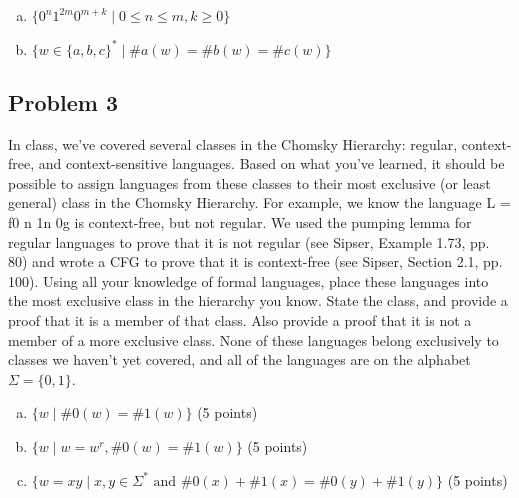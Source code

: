 \documentclass{article}
\begin{document}
\begin{enumerate}[(a)]
    \item $\{ 0^n 1^{2m} 0^{m+k} \;|\; 0 \le n \le m, k \ge 0 \}$
    \item $\{w\in \{a,b,c\}^* \;|\; \#a(w)=\#b(w)=\#c(w)\}$
\end{enumerate}

\newpage
\subsection*{Problem 3}
In class, we’ve covered several classes in the Chomsky Hierarchy: regular, context-free, and
context-sensitive languages. Based on what you’ve learned, it should be possible to assign
languages from these classes to their most exclusive (or least general) class in the Chomsky
Hierarchy. For example, we know the language L = f0 n 1n 0g is context-free, but not regular.
We used the pumping lemma for regular languages to prove that it is not regular (see Sipser,
Example 1.73, pp. 80) and wrote a CFG to prove that it is context-free (see Sipser, Section
2.1, pp. 100). Using all your knowledge of formal languages, place these languages into the
most exclusive class in the hierarchy you know. State the class, and provide a proof that it is
a member of that class. Also provide a proof that it is not a member of a more exclusive
class. None of these languages belong exclusively to classes we haven’t yet covered, and all
of the languages are on the alphabet $\Sigma = \{0,1\}$.
\begin{enumerate}[(a)]
    \item $\{w \;|\; \#0(w)=\#1(w)\}$ (5 points)
    \item $\{w \;|\; w=w^r, \#0(w)=\#1(w)\}$ (5 points)
    \item $\{w=xy \;|\; x,y\in\Sigma^* \text{ and } \#0(x)+\#1(x)=\#0(y)+\#1(y)\}$ (5 points)
\end{enumerate}
\newpage
\end{document}
